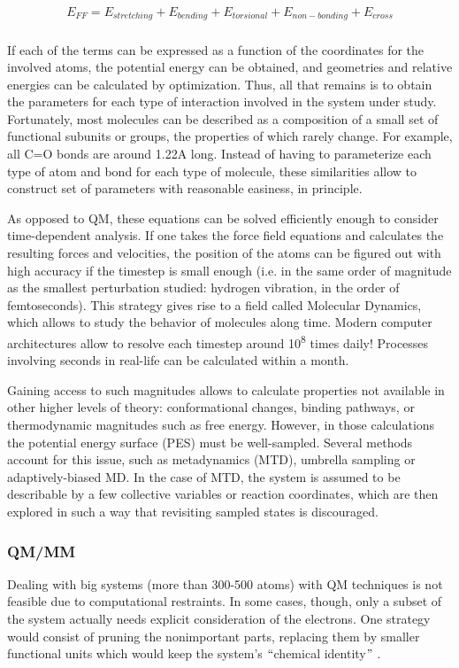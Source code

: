  \begin{align}
	E_{FF}=E_{stretching}+E_{bending}+E_{torsional}+E_{non-bonding}+E_{cross} \\ \tag{Force field energy}
\end{align}

If each of the terms can be expressed as a function of the coordinates for the involved atoms, the potential energy can be obtained, and geometries and relative energies can be calculated by optimization. Thus, all that remains is to obtain the parameters for each type of interaction involved in the system under study. Fortunately, most molecules can be described as a composition of a small set of functional subunits or groups, the properties of which rarely change. For example, all C=O bonds are around 1.22A long. Instead of having to parameterize each type of atom and bond for each type of molecule, these similarities allow to construct set of parameters with reasonable easiness, in principle.

As opposed to QM, these equations can be solved efficiently enough to consider time-dependent analysis. If one takes the force field equations and calculates the resulting forces and velocities, the position of the atoms can be figured out with high accuracy if the timestep is small enough (i.e. in the same order of magnitude as the smallest perturbation studied: hydrogen vibration, in the order of femtoseconds). This strategy gives rise to a field called Molecular Dynamics, which allows to study the behavior of molecules along time. Modern computer architectures allow to resolve each timestep around 10\textsuperscript{8 }times daily! Processes involving seconds in real-life can be calculated within a month.

Gaining access to such magnitudes allows to calculate properties not available in other higher levels of theory: conformational changes, binding pathways, or thermodynamic magnitudes such as free energy. However, in those calculations the potential energy surface (PES) must be well-sampled. Several methods account for this issue, such as metadynamics (MTD), umbrella sampling or adaptively-biased MD. In the case of MTD, the system is assumed to be describable by a few collective variables or reaction coordinates, which are then explored in such a way that revisiting sampled states is discouraged.

\subsubsection{QM/MM}
Dealing with big systems (more than 300-500 atoms) with QM techniques is not feasible due to computational restraints. In some cases, though, only a subset of the system actually needs explicit consideration of the electrons. One strategy would consist of pruning the nonimportant parts, replacing them by smaller functional units which would keep the system’s $``$chemical identity$"$ .

